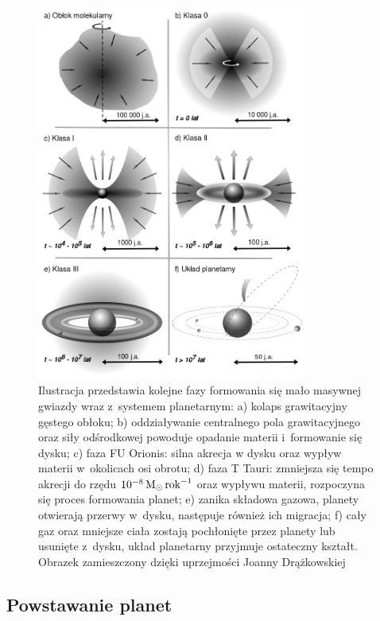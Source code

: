 \begin{figure}[p]
\centering 
\includegraphics[width=0.8\textwidth]{figures/planetformation.png}
\caption{Ilustracja przedstawia kolejne fazy formowania się mało masywnej gwiazdy
   wraz z~systemem planetarnym: a) kolaps grawitacyjny gęstego obłoku; b)
   oddziaływanie centralnego pola grawitacyjnego oraz siły odśrodkowej powoduje
   opadanie materii i~formowanie się dysku; c) faza FU Orionis: silna akrecja w
   dysku oraz wypływ materii w~okolicach osi obrotu; d) faza T Tauri: zmniejsza
   się tempo akrecji do rzędu $10^{-8}\hbox{$\mathrm{\thinspace M_{\odot}}$}\hbox{$\thinspace\textrm{rok}$}^{-1}$ oraz wypływu materii,
   rozpoczyna się proces formowania planet; e) zanika składowa gazowa, planety
otwierają przerwy w~dysku, następuje również ich migracja; f) cały gaz oraz
mniejsze ciała zostają pochłonięte przez planety lub usunięte z~dysku, układ
planetarny przyjmuje ostateczny kształt. Obrazek zamieszczony dzięki uprzejmości
Joanny Drążkowskiej}

\label{fig:planet}
\end{figure}

\subsection{Powstawanie planet}


